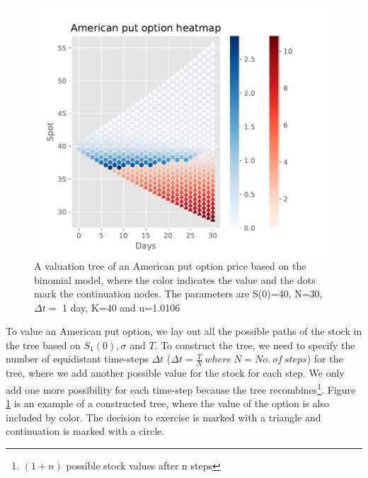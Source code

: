 \begin{figure}[th]
\centering
\includegraphics{Figures/BinomialTree.pdf}
\decoRule
\caption[Exercise Decisions Binomial Tree]{A valuation tree of an American put option price based on the binomial model, where the color indicates the value and the dots mark the continuation nodes. The parameters are S(0)=40, N=30, $\Delta t =$ 1 day, K=40 and u=1.0106}
\label{fig:BinomialTree}
\end{figure}

To value an American put option, we lay out all the possible paths of the stock in the tree based on $S_1(0),\sigma$ and $T$. To construct the tree, we need to specify the number of equidistant time-steps $\Delta t$ ($\Delta t = \frac{T}{N} \ where \ N=No. \ of  \ steps$) for the tree, where we add another possible value for the stock for each step. We only add one more possibility for each time-step because the tree recombines\footnote{$(1+n)$ possible stock values after n steps}. Figure \ref{fig:BinomialTree} is an example of a constructed tree, where the value of the option is also included by color. The decision to exercise is marked with a triangle and continuation is marked with a circle. \\

